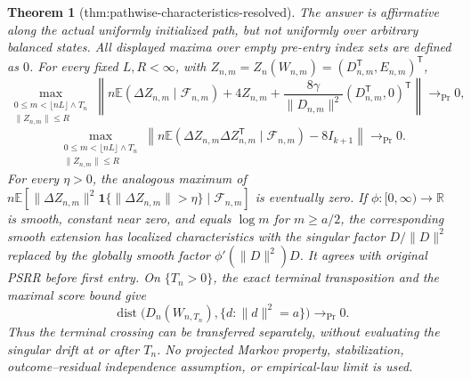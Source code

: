 \documentclass{article}
\newtheorem{theorem}{Theorem}
\begin{document}
\begin{theorem}[thm:pathwise-characteristics-resolved]\label{thm:pathwise-characteristics-resolved}
The answer is affirmative along the actual uniformly initialized path, but not uniformly over arbitrary balanced states.  All displayed maxima over empty pre-entry index sets are defined as \(0\).  For every fixed \(L,R<\infty\), with \(Z_{n,m}=Z_n(W_{n,m})=(D_{n,m}^{\mathsf T},E_{n,m})^{\mathsf T}\),
\[
 \max_{\substack{0\le m<\lfloor nL\rfloor\wedge T_n\\ \|Z_{n,m}\|\le R}}
 \left\|n\mathbb E(\Delta Z_{n,m}\mid\mathcal F_{n,m})+4Z_{n,m}
 +\frac{8\gamma}{\|D_{n,m}\|^2}(D_{n,m}^{\mathsf T},0)^{\mathsf T}\right\|\longrightarrow_{\Pr}0,
\]
\[
 \max_{\substack{0\le m<\lfloor nL\rfloor\wedge T_n\\ \|Z_{n,m}\|\le R}}
 \left\|n\mathbb E(\Delta Z_{n,m}\Delta Z_{n,m}^{\mathsf T}\mid\mathcal F_{n,m})-8I_{k+1}\right\|\longrightarrow_{\Pr}0.
\]
For every \(\eta>0\), the analogous maximum of
\(n\mathbb E[\|\Delta Z_{n,m}\|^2\mathbf 1\{\|\Delta Z_{n,m}\|>\eta\}\mid\mathcal F_{n,m}]\) is eventually zero.  If \(\phi:[0,\infty)\to\mathbb R\) is smooth, constant near zero, and equals \(\log m\) for \(m\ge a/2\), the corresponding smooth extension has localized characteristics with the singular factor \(D/\|D\|^2\) replaced by the globally smooth factor \(\phi'(\|D\|^2)D\).  It agrees with original PSRR before first entry.  On \(\{T_n>0\}\), the exact terminal transposition and the maximal score bound give
\[
 \operatorname{dist}\bigl(D_n(W_{n,T_n}),\{d:\|d\|^2=a\}\bigr)\longrightarrow_{\Pr}0.
\]
Thus the terminal crossing can be transferred separately, without evaluating the singular drift at or after \(T_n\).  No projected Markov property, stabilization, outcome--residual independence assumption, or empirical-law limit is used.
\end{theorem}
\end{document}
